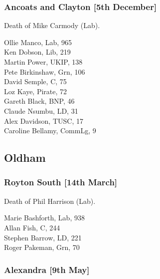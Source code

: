 \documentclass[a4paper,openany,10pt]{book}
\begin{document}
\subsubsection*{Ancoats and Clayton \hspace*{\fill}\nolinebreak[1]%
\enspace\hspace*{\fill}
[5th December]}


Death of Mike Carmody (Lab).



Ollie Manco, Lab, 965\\
Ken Dobson, Lib, 219\\
Martin Power, UKIP, 138\\
Pete Birkinshaw, Grn, 106\\
David Semple, C, 75\\
Loz Kaye, Pirate, 72\\
Gareth Black, BNP, 46\\
Claude Nsumbu, LD, 31\\
Alex Davidson, TUSC, 17\\
Caroline Bellamy, CommLg, 9\\


\subsection*{Oldham}

\subsubsection*{Royton South \hspace*{\fill}\nolinebreak[1]%
\enspace\hspace*{\fill}
[14th March]}


Death of Phil Harrison (Lab).



Marie Bashforth, Lab, 938\\
Allan Fish, C, 244\\
Stephen Barrow, LD, 221\\
Roger Pakeman, Grn, 70\\


\subsubsection*{Alexandra \hspace*{\fill}\nolinebreak[1]%
\enspace\hspace*{\fill}
[9th May]}
\end{document}
